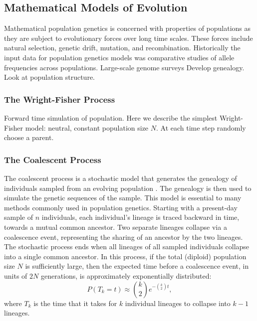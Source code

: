 \subsection{Mathematical Models of Evolution}
\label{background:ss:evolutionary_models}

Mathematical population genetics is concerned with properties of populations as they are subject to evolutionary forces over long time scales.
These forces include natural selection, genetic drift, mutation, and recombination.
Historically the input data for population genetics models was comparative studies of allele frequencies across populations.
Large-scale genome surveys 
Develop genealogy.
Look at population structure.

\subsubsection{The Wright-Fisher Process}

Forward time simulation of population.
Here we describe the simplest Wright-Fisher model: neutral, constant population size $N$.
At each time step randomly choose a parent.

\subsubsection{The Coalescent Process}
\label{background:sss:coalescent}

The coalescent process is a stochastic model that generates the genealogy of individuals sampled from an evolving population \cite{Wakeley:2009}.
The genealogy is then used to simulate the genetic sequences of the sample.
This model is essential to many methods commonly used in population genetics.
Starting with a present-day sample of $n$ individuals, each individual's lineage is traced backward in time, towards a mutual common ancestor.
Two separate lineages collapse via a coalescence event, representing the sharing of an ancestor by the two lineages.
The stochastic process ends when all lineages of all sampled individuals collapse into a single common ancestor.
In this process, if the total (diploid) population size $N$ is sufficiently large, then the expected time before a coalescence event, in units of $2N$ generations, is approximately exponentially distributed:
\begin{equation}
P(T_{k}=t) \approx \binom{k}{2} e ^{-\binom{k}{2} t},
\end{equation}
where $T_k$ is the time that it takes for $k$ individual lineages to collapse into $k-1$ lineages.

